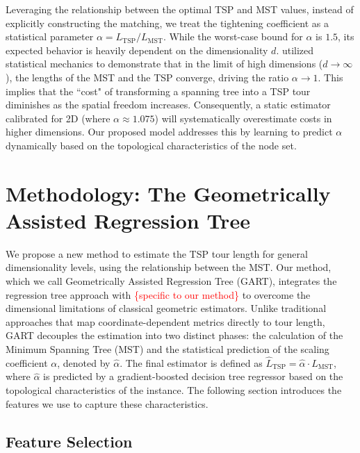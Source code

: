 \documentclass{article}
\begin{document}
Leveraging the relationship between the optimal TSP and MST values, instead of explicitly constructing the matching, we treat the tightening coefficient as a statistical parameter $\alpha = L_{\text{TSP}} / L_{\text{MST}}$. 
While the worst-case bound for $\alpha$ is $1.5$, its expected behavior is heavily dependent on the dimensionality $d$. \citet{percus1996} utilized statistical mechanics to demonstrate that in the limit of high dimensions ($d \to \infty$), the lengths of the MST and the TSP converge, driving the ratio $\alpha \to 1$. 
This implies that the ``cost" of transforming a spanning tree into a TSP tour diminishes as the spatial freedom increases. 
Consequently, a static estimator calibrated for 2D (where $\alpha \approx 1.075$) will systematically overestimate costs in higher dimensions. 
Our proposed model addresses this by learning to predict $\alpha$ dynamically based on the topological characteristics of the node set.


\section{Methodology: The Geometrically Assisted Regression Tree} \label{sec:methodology}

We propose a new method to estimate the TSP tour length for general dimensionality levels, using the relationship between the MST. Our method, which we call Geometrically Assisted Regression Tree (GART), integrates the regression tree approach with \textcolor{red}{\{specific to our method\}} to overcome the dimensional limitations of classical geometric estimators.
Unlike traditional approaches that map coordinate-dependent metrics directly to tour length, GART decouples the estimation into two distinct phases: the calculation of the Minimum Spanning Tree (MST) and the statistical prediction of the scaling coefficient $\alpha$, denoted by $\hat{\alpha}$. The final estimator is defined as $\hat{L}_{\text{TSP}} = \hat{\alpha} \cdot L_{\text{MST}}$, where $\hat{\alpha}$ is predicted by a gradient-boosted decision tree regressor based on the topological characteristics of the instance. The following section introduces the features we use to capture these characteristics.

\subsection{Feature Selection} \label{subsec:features}
\end{document}
